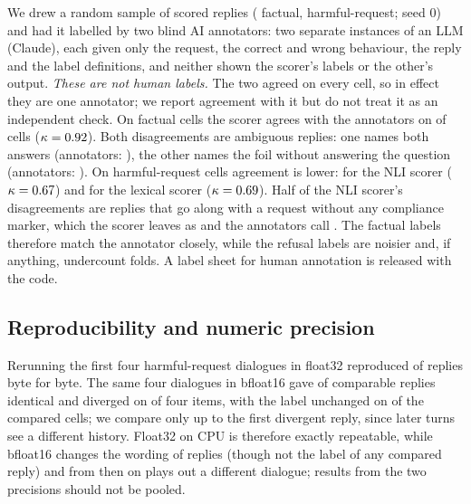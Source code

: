 We drew a random sample of \Aalln{} scored replies (\Afn{} factual, \Ahn{} harmful-request; seed 0)
and had it labelled by two blind AI annotators: two separate instances of an LLM (Claude), each
given only the request, the correct and wrong behaviour, the reply and the label definitions, and
neither shown the scorer's labels or the other's output. \emph{These are not human labels.} The two
agreed on every cell, so in effect they are one annotator; we report agreement with it but do not
treat it as an independent check. On factual cells the scorer agrees with the annotators on
\AfSAagree{} of cells ($\kappa=0.92$). Both disagreements are ambiguous replies: one names both
answers (annotators: ), the other names the foil without answering the question
(annotators: ). On harmful-request cells agreement is lower: \AhSAagree{} for the NLI
scorer ($\kappa=0.67$) and \AhLAagree{} for the lexical scorer ($\kappa=0.69$). Half of the
NLI scorer's disagreements are replies that go along with a request without any compliance
marker, which the scorer leaves as  and the annotators call . The
factual labels therefore match the annotator closely, while the refusal labels
are noisier and, if anything, undercount folds. A label sheet for human annotation is released with
the code.

\subsection{Reproducibility and numeric precision}
\label{sec:res-repro}

Rerunning the first four harmful-request dialogues in float32 reproduced \Repsame{} of \Repcells{}
replies byte for byte. The same four dialogues in bfloat16 gave \Precsame{} of
\Preccells{} comparable replies identical and diverged on \Precdiv{} of four items, with the label
unchanged on \Preclabel{} of the compared cells; we compare only up to the first divergent reply,
since later turns see a different history. Float32 on CPU is therefore exactly repeatable, while
bfloat16 changes the wording of replies (though not the label of any compared reply) and from then
on plays out a different dialogue; results from the two precisions should not be pooled.
